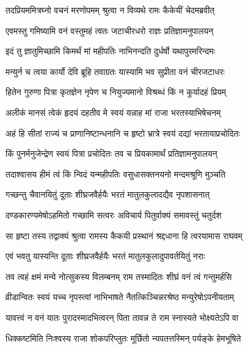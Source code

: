 \twolineshloka
{तदप्रियममित्रघ्नो वचनं मरणोपमम्}
{श्रुत्वा न विव्यथे रामः कैकेयीं चेदमब्रवीत्} %

\twolineshloka
{एवमस्तु गमिष्यामि वनं वस्तुमहं त्वतः}
{जटाचीरधरो राज्ञः प्रतिज्ञामनुपालयन्} %

\twolineshloka
{इदं तु ज्ञातुमिच्छामि किमर्थं मां महीपतिः}
{नाभिनन्दति दुर्धर्षो यथापुरमरिन्दमः} %

\twolineshloka
{मन्युर्न च त्वया कार्यो देवि ब्रूहि तवाग्रतः}
{यास्यामि भव सुप्रीता वनं चीरजटाधरः} %

\twolineshloka
{हितेन गुरुणा पित्रा कृतज्ञेन नृपेण च}
{नियुज्यमानो विश्रब्धं किं न कुर्यादहं प्रियम्} %

\twolineshloka
{अलीकं मानसं त्वेकं हृदयं दहतीव मे}
{स्वयं यन्नाह मां राजा भरतस्याभिषेचनम्} %

\twolineshloka
{अहं हि सीतां राज्यं च प्राणानिष्टान्धनानि च}
{हृष्टो भ्रात्रे स्वयं दद्यां भरतायाप्रचोदितः} %

\twolineshloka
{किं पुनर्मनुजेन्द्रेण स्वयं पित्रा प्रचोदितः}
{तव च प्रियकामार्थं प्रतिज्ञामनुपालयन्} %

\twolineshloka
{तदाश्वासय हीमं त्वं किं न्विदं यन्महीपतिः}
{वसुधासक्तनयनो मन्दमश्रूणि मुञ्चति} %

\twolineshloka
{गच्छन्तु चैवानयितुं दूताः शीघ्रजवैर्हयैः}
{भरतं मातुलकुलादद्यैव नृपशासनात्} %

\twolineshloka
{दण्डकारण्यमेषोऽहमितो गच्छामि सत्वरः}
{अविचार्य पितुर्वाक्यं समावस्तुं चतुर्दश} %

\twolineshloka
{सा हृष्टा तस्य तद्वाक्यं श्रुत्वा रामस्य कैकयी}
{प्रस्थानं श्रद्दधाना हि त्वरयामास राघवम्} %

\twolineshloka
{एवं भवतु यास्यन्ति दूताः शीघ्रजवैर्हयैः}
{भरतं मातुलकुलादुपावर्तयितुं नराः} %

\twolineshloka
{तव त्वहं क्षमं मन्ये नोत्सुकस्य विलम्बनम्}
{राम तस्मादितः शीघ्रं वनं त्वं गन्तुमर्हसि} %

\twolineshloka
{व्रीडान्वितः स्वयं यच्च नृपस्त्वां नाभिभाषते}
{नैतत्किञ्चिन्नरश्रेष्ठ मन्युरेषोऽपनीयताम्} %

\twolineshloka
{यावत्त्वं न वनं यातः पुरादस्मादभित्वरन्}
{पिता तावन्न ते राम स्नास्यते भोक्ष्यतेऽपि वा} %

\twolineshloka
{धिक्कष्टमिति निःश्वस्य राजा शोकपरिप्लुतः}
{मूर्छितो न्यपतत्तस्मिन् पर्यङ्के हेमभूषिते} %

